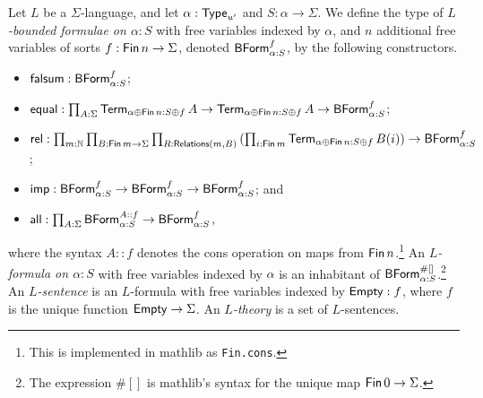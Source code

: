\begin{definition}
  Let \( L \) be a \( \Sigma \)-language, and let \( \alpha : \mathsf{Type}_{u'} \) and \( S : \alpha \to \Sigma \).
  We define the type of \emph{\( L \)-bounded formulae on \( \alpha : S \)} with free variables indexed by \( \alpha \), and \( n \) additional free variables of sorts \( f : \operatorname{\mathsf{Fin}} n \to \Sigma \), denoted \( \mathsf{BForm}_{\alpha:S}^f \), by the following constructors.
  \begin{itemize}
    \item \( \operatorname{\mathsf{falsum}} : \mathsf{BForm}_{\alpha:S}^f \);
    \item \( \operatorname{\mathsf{equal}} : \prod_{A : \Sigma} \operatorname{\mathsf{Term}}_{\alpha \oplus \operatorname{\mathsf{Fin}} n : S \oplus f} A \to \operatorname{\mathsf{Term}}_{\alpha \oplus \operatorname{\mathsf{Fin}} n : S \oplus f} A \to \mathsf{BForm}_{\alpha:S}^f \);
    \item \( \operatorname{\mathsf{rel}} : \prod_{m : \mathbb N} \prod_{B : \operatorname{\mathsf{Fin}} m \to \Sigma} \prod_{R : \operatorname{\mathsf{Relations}}(m, B)} \left( \prod_{i : \operatorname{\mathsf{Fin}} m} \operatorname{\mathsf{Term}}_{\alpha \oplus \operatorname{\mathsf{Fin}} n : S \oplus f} B(i) \right) \to \mathsf{BForm}_{\alpha:S}^f \);
    \item \( \operatorname{\mathsf{imp}} : \mathsf{BForm}_{\alpha:S}^f \to \mathsf{BForm}_{\alpha:S}^f \to \mathsf{BForm}_{\alpha:S}^f \); and
    \item \( \operatorname{\mathsf{all}} : \prod_{A : \Sigma} \mathsf{BForm}_{\alpha:S}^{A :: f} \to \mathsf{BForm}_{\alpha:S}^f \),
  \end{itemize}
  where the syntax \( A :: f \) denotes the cons operation on maps from \( \operatorname{\mathsf{Fin}} n \).\footnote{This is implemented in mathlib as \texttt{Fin.cons}.}
  An \emph{\( L \)-formula on \( \alpha : S \)} with free variables indexed by \( \alpha \) is an inhabitant of \( \mathsf{BForm}_{\alpha:S}^{\#[]} \).\footnote{The expression \( \#[] \) is mathlib's syntax for the unique map \( \operatorname{\mathsf{Fin}} 0 \to \Sigma \).}
  An \emph{\( L \)-sentence} is an \( L \)-formula with free variables indexed by \( \operatorname{\mathsf{Empty}} : f \), where \( f \) is the unique function \( \operatorname{\mathsf{Empty}} \to \Sigma \).
  An \emph{\( L \)-theory} is a set of \( L \)-sentences.
\end{definition}

